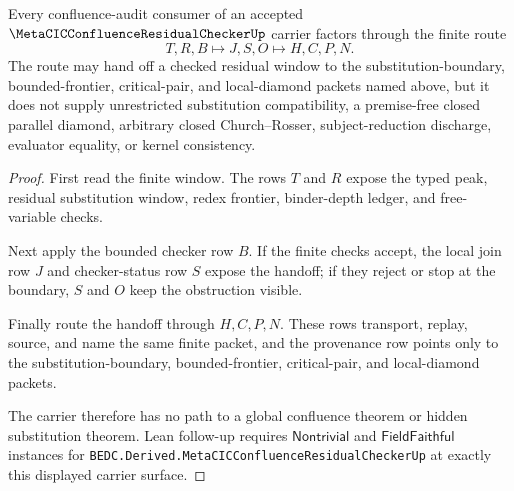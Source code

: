 \begin{theorem}
\label{thm:metacic-confluence-residual-checker-handoff}
Every confluence-audit consumer of an accepted $\MetaCICConfluenceResidualCheckerUp$ carrier factors through the finite route
$$
T,R,B \longmapsto J,S,O \longmapsto H,C,P,N .
$$
The route may hand off a checked residual window to the substitution-boundary, bounded-frontier, critical-pair, and local-diamond packets named above, but it does not supply unrestricted substitution compatibility, a premise-free closed parallel diamond, arbitrary closed Church--Rosser, subject-reduction discharge, evaluator equality, or kernel consistency.
\end{theorem}
\begin{proof}
First read the finite window. The rows $T$ and $R$ expose the typed peak, residual substitution window, redex frontier, binder-depth ledger, and free-variable checks.

Next apply the bounded checker row $B$. If the finite checks accept, the local join row $J$ and checker-status row $S$ expose the handoff; if they reject or stop at the boundary, $S$ and $O$ keep the obstruction visible.

Finally route the handoff through $H,C,P,N$. These rows transport, replay, source, and name the same finite packet, and the provenance row points only to the substitution-boundary, bounded-frontier, critical-pair, and local-diamond packets.

The carrier therefore has no path to a global confluence theorem or hidden substitution theorem. Lean follow-up requires $\mathsf{Nontrivial}$ and $\mathsf{FieldFaithful}$ instances for \texttt{BEDC.Derived.MetaCICConfluenceResidualCheckerUp} at exactly this displayed carrier surface.
\end{proof}


